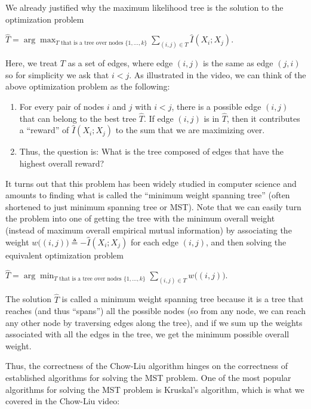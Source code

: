 We already justified why the maximum likelihood tree is the solution to the optimization problem

{\centering$\widehat{T}=\arg \max _{T\text { that is a tree over nodes }\{ 1,\dots ,k\} }\sum _{(i,j)\in T}\widehat{I}(X_{i};X_{j}).$ \par}
 
Here, we treat $T$ as a set of edges, where edge $(i,j)$ is the same as edge $(j,i)$ so for simplicity we ask that $i<j$. As illustrated in the video, we can think of the above optimization problem as the following:

\begin{enumerate}
\item For every pair of nodes $i$ and $j$ with $i<j$, there is a possible edge $(i,j)$ that can belong to the best tree $\widehat{T}$. If edge $(i,j)$ is in $\widehat{T}$, then it contributes a ``reward'' of $\widehat{I}(X_{i};X_{j})$ to the sum that we are maximizing over.

\item Thus, the question is: What is the tree composed of edges that have the highest overall reward?
\end{enumerate}

It turns out that this problem has been widely studied in computer science and amounts to finding what is called the ``minimum weight spanning tree'' (often shortened to just minimum spanning tree or MST). Note that we can easily turn the problem into one of getting the tree with the minimum overall weight (instead of maximum overall empirical mutual information) by associating the weight $w\big ((i,j)\big )\triangleq -\widehat{I}(X_{i};X_{j})$ for each edge $(i,j)$, and then solving the equivalent optimization problem

{\centering$\widehat{T}=\arg \min _{T\text { that is a tree over nodes }\{ 1,\dots ,k\} }\sum _{(i,j)\in T}w\big ((i,j)\big ).$ \par}
 
The solution $\widehat{T}$ is called a minimum weight spanning tree because it is a tree that reaches (and thus ``spans'') all the possible nodes (so from any node, we can reach any other node by traversing edges along the tree), and if we sum up the weights associated with all the edges in the tree, we get the minimum possible overall weight.

Thus, the correctness of the Chow-Liu algorithm hinges on the correctness of established algorithms for solving the MST problem. One of the most popular algorithms for solving the MST problem is Kruskal's algorithm, which is what we covered in the Chow-Liu video:

